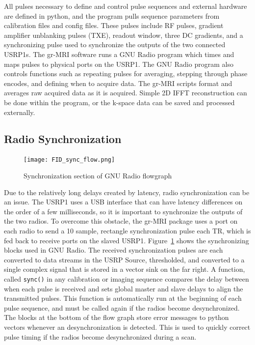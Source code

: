 \documentclass[review]{elsarticle}
\renewcommand{\textcolor}[1]{}
\begin{document}
\indent All pulses necessary to define and control pulse sequences and external hardware are defined in python, and the program pulls sequence parameters from calibration files and config files.  These pulses include RF pulses, gradient amplifier unblanking pulses (TXE), readout window, three DC gradients, and a synchronizing pulse used to synchronize the outputs of the two connected USRP1s.  The gr-MRI software runs a GNU Radio program which times and maps pulses to physical ports on the USRP1.  The GNU Radio program also controls functions such as repeating pulses for averaging, stepping through phase encodes, and defining when to acquire data.  The gr-MRI scripts format and averages raw acquired data as it is acquired.  Simple 2D IFFT reconstruction can be done within the program, or the k-space data can be saved and processed externally.

\subsection{Radio Synchronization}\label{Radio Synchronization}

\begin{figure}[ht]
\begin{center}
\texttt{[image: FID\_sync\_flow.png]}
\caption{\textcolor{black}{Synchronization section of GNU Radio flowgraph}}
\label{fig:syncflow}
\end{center}
\end{figure}

\indent Due to the relatively long delays created by latency, radio synchronization can be an issue.  The USRP1 uses a USB interface that can have latency differences on the order of a few milliseconds, so it is important to synchronize the outputs of the two radios.  To overcome this obstacle, the gr-MRI package uses a port on each radio to send a 10 sample, rectangle synchronization pulse each TR, which is fed back to receive ports on the slaved USRP1.  Figure~\ref{fig:syncflow} shows the synchronizing blocks used in GNU Radio.  The received synchronization pulses are each converted to data streams in the USRP Source, thresholded, and converted to a single complex signal that is stored in a vector sink on the far right.  A function, called  \texttt{sync()} in any calibration or imaging sequence compares the delay between when each pulse is received and sets global master and slave delays to align the transmitted pulses.  This function is automatically run at the beginning of each pulse sequence, and must be called again if the radios become desynchronized.  The blocks at the bottom of the flow graph store error messages to python vectors whenever an desynchronization is detected.  This is used to quickly correct pulse timing if the radios become desynchronized during a scan.
\end{document}
